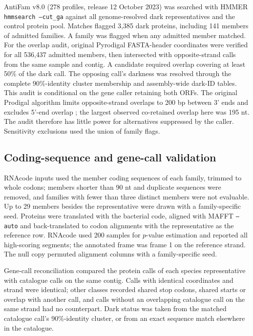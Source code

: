 AntiFam v8.0 (278 profiles, release 12 October 2023) was searched with HMMER
\texttt{hmmsearch --cut\_ga} against all genome-resolved dark representatives and the control
protein pool. Matches flagged 3{,}385 dark proteins, including 141 members of admitted families.
A family was flagged when any admitted member matched. For the overlap audit, original Pyrodigal
FASTA-header coordinates were verified for all 536{,}437 admitted members, then intersected with
opposite-strand calls from the same sample and contig. A candidate required overlap covering at
least 50\% of the dark call. The opposing call's darkness was resolved through the complete
90\%-identity cluster membership and assembly-wide dark-ID tables. This audit is conditional on
the gene caller retaining both ORFs. The original Prodigal algorithm limits opposite-strand overlaps to 200 bp between 3' ends and excludes 5'-end overlap \citep{hyatt2010prodigal}; the largest observed co-retained overlap here was 195 nt. The audit therefore has little power for alternatives suppressed by the caller. Sensitivity exclusions used the union of family flags.

\subsection*{Coding-sequence and gene-call validation}
RNAcode inputs used the member coding sequences of each family, trimmed to whole codons; members shorter than 90 nt and duplicate sequences were removed, and families with fewer than three distinct members were not evaluable. Up to 29 members besides the representative were drawn with a family-specific seed. Proteins were translated with the bacterial code, aligned with MAFFT \texttt{--auto} and back-translated to codon alignments with the representative as the reference row. RNAcode used 200 samples for $p$-value estimation and reported all high-scoring segments; the annotated frame was frame 1 on the reference strand. The null copy permuted alignment columns with a family-specific seed.

Gene-call reconciliation compared the protein calls of each species representative with catalogue calls on the same contig. Calls with identical coordinates and strand were identical; other classes recorded shared stop codons, shared starts or overlap with another call, and calls without an overlapping catalogue call on the same strand had no counterpart. Dark status was taken from the matched catalogue call's 90\%-identity cluster, or from an exact sequence match elsewhere in the catalogue.

